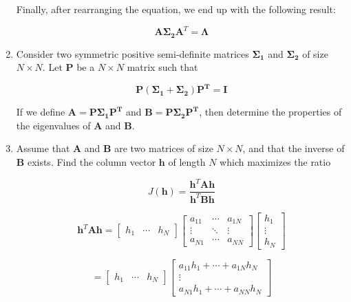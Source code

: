\documentclass[fleqn]{article}
\begin{document}
\begin{enumerate}
		Finally, after rearranging the equation, we end up with the following result:
		
		\begin{equation*}
			\mathbf{A}\mathbf{\Sigma_2}\mathbf{A}^T = \mathbf{\Lambda}
		\end{equation*}
		
		\item Consider two symmetric positive semi-definite matrices $\mathbf{\Sigma_1}$ and $\mathbf{\Sigma_2}$ of size $N \times N$. Let $\mathbf{P}$ be a $N \times N$ matrix such that
		
		\begin{equation*}
			\mathbf{P}(\mathbf{\Sigma_1} + \mathbf{\Sigma_2})\mathbf{P^T} = \mathbf{I}
		\end{equation*}
		
		If we define $\mathbf{A} = \mathbf{P}\mathbf{\Sigma_1}\mathbf{P^T}$ and $\mathbf{B} = \mathbf{P}\mathbf{\Sigma_2}\mathbf{P^T}$, then determine the properties of the eigenvalues of $\mathbf{A}$ and $\mathbf{B}$.
		
		\item Assume that $\mathbf{A}$ and $\mathbf{B}$ are two matrices of size $N \times N$, and that the inverse of $\mathbf{B}$ exists. Find the column vector $\mathbf{h}$ of length $N$ which maximizes the ratio
		
		\begin{equation*}
			J(\mathbf{h}) = \frac{\mathbf{h}^T\mathbf{A}\mathbf{h}}{\mathbf{h}^T\mathbf{B}\mathbf{h}}
		\end{equation*}
		
		\begin{equation*}
			\mathbf{h}^T\mathbf{A}\mathbf{h} = \begin{bmatrix}h_1 & \cdots & h_N\end{bmatrix}\begin{bmatrix}a_{11} & \cdots & a_{1N} \\ \vdots & \ddots & \vdots \\ a_{N1} & \cdots & a_{NN}\end{bmatrix}\begin{bmatrix}h_1 \\ \vdots \\ h_N \end{bmatrix}
		\end{equation*}
		
		\begin{equation*}
			= \begin{bmatrix}h_1 & \cdots & h_N\end{bmatrix}\begin{bmatrix}a_{11}h_1 + \cdots + a_{1N}h_N \\ \vdots \\ a_{N1}h_1 + \cdots + a_{NN}h_N\end{bmatrix}
		\end{equation*}
		

\end{enumerate}
\end{document}
